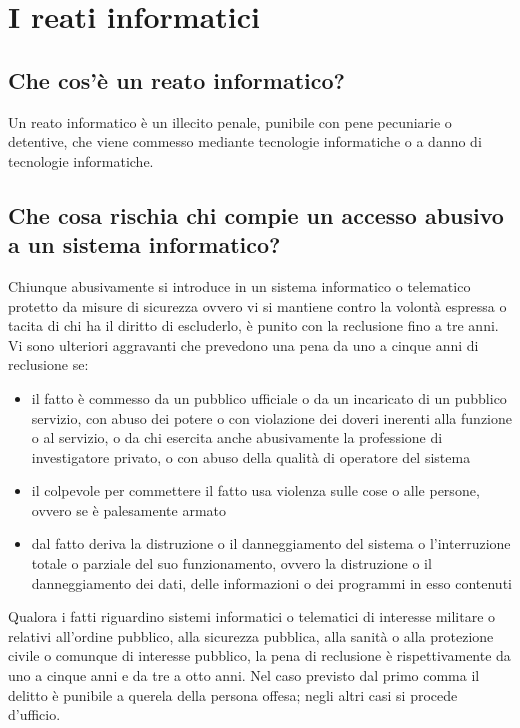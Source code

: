 \newpage
\section{I reati informatici}
\subsection{Che cos'è un reato informatico?}
Un reato informatico è un illecito penale, punibile con pene pecuniarie o
detentive, che viene commesso mediante tecnologie informatiche o a danno di
tecnologie informatiche.
\subsection{Che cosa rischia chi compie un accesso abusivo a un sistema informatico?}
Chiunque abusivamente si introduce in un sistema informatico o telematico
protetto da misure di sicurezza ovvero vi si mantiene contro la volontà
espressa o tacita di chi ha il diritto di escluderlo, è punito con la
reclusione fino a tre anni.
Vi sono ulteriori aggravanti che prevedono una pena da uno a cinque anni di reclusione se:
\begin{itemize}
    \item il fatto è commesso da un pubblico ufficiale o da un incaricato di un
        pubblico servizio, con abuso dei potere o con violazione dei doveri
        inerenti alla funzione o al servizio, o da chi esercita anche
        abusivamente la professione di investigatore privato, o con abuso della
        qualità di operatore del sistema 
    \item il colpevole per commettere il fatto usa violenza sulle cose o alle
        persone, ovvero se è palesamente armato
    \item dal fatto deriva la distruzione o il danneggiamento del sistema o
        l'interruzione totale o parziale del suo funzionamento, ovvero la
        distruzione o il danneggiamento dei dati, delle informazioni o dei
        programmi in esso contenuti
\end{itemize}
Qualora i fatti riguardino sistemi informatici o telematici di interesse
militare o relativi all'ordine pubblico, alla sicurezza pubblica, alla sanità o
alla protezione civile o comunque di interesse pubblico, la pena di reclusione
è rispettivamente da uno a cinque anni e da tre a otto anni.
\newline
Nel caso previsto dal primo comma il delitto è punibile a querela della persona
offesa; negli altri casi si procede d'ufficio.
